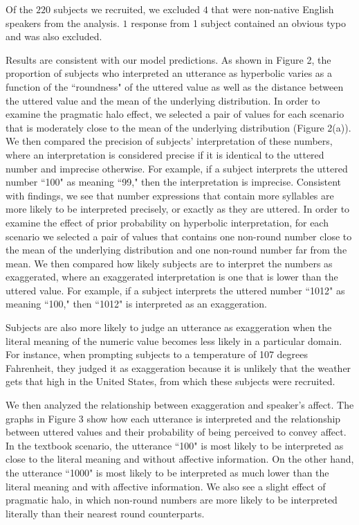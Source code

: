 \documentclass{article} %
\begin{document}
Of the $220$ subjects we recruited, we excluded $4$ that were non-native English speakers from the analysis. $1$ response from 1 subject contained an obvious typo and was also excluded. 

Results are consistent with our model predictions. As shown in Figure 2, the proportion of subjects who interpreted an utterance as hyperbolic varies as a function of the ``roundness" of the uttered value as well as the distance between the uttered value and the mean of the underlying distribution. In order to examine the pragmatic halo effect, we selected a pair of values for each scenario that is moderately close to the mean of the underlying distribution (Figure 2(a)). We then compared the precision of subjects' interpretation of these numbers, where an interpretation is considered precise if it is identical to the uttered number and imprecise otherwise. For example, if a subject interprets the uttered number ``100" as meaning ``99," then the interpretation is imprecise. Consistent with \cite{someone} findings, we see that number expressions that contain more syllables are more likely to be interpreted precisely, or exactly as they are uttered. In order to examine the effect of prior probability on hyperbolic interpretation, for each scenario we selected a pair of values that contains one non-round number close to the mean of the underlying distribution and one non-round number far from the mean. We then compared how likely subjects are to interpret the numbers as exaggerated, where an exaggerated interpretation is one that is lower than the uttered value. For example, if a subject interprets the uttered number ``1012" as meaning ``100," then ``1012" is interpreted as an exaggeration. 

Subjects are also more likely to judge an utterance as exaggeration when the literal meaning of the numeric value becomes less likely in a particular domain. For instance, when prompting subjects to a temperature of 107 degrees Fahrenheit, they judged it as exaggeration because it is unlikely that the weather gets that high in the United States, from which these subjects were recruited.


We then analyzed the relationship between exaggeration and speaker's affect. The graphs in Figure 3 show how each utterance is interpreted and the relationship between uttered values and their probability of being perceived to convey affect. In the textbook scenario, the utterance ``100" is most likely to be interpreted as close to the literal meaning and without affective information. On the other hand, the utterance ``1000" is most likely to be interpreted as much lower than the literal meaning and with affective information. We also see a slight effect of pragmatic halo, in which non-round numbers are more likely to be interpreted literally than their nearest round counterparts. 
\end{document}
